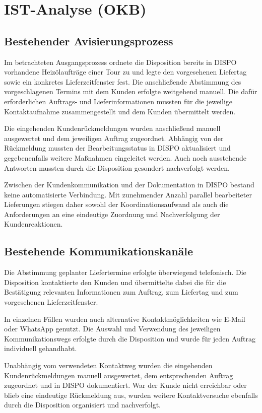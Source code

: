 \section{IST-Analyse (OKB)}

\subsection{Bestehender Avisierungsprozess}

Im betrachteten Ausgangsprozess ordnete die Disposition bereits
in DISPO vorhandene Heizölaufträge einer Tour zu und
legte den vorgesehenen Liefertag sowie ein konkretes
Lieferzeitfenster fest. Die anschließende Abstimmung des
vorgeschlagenen Termins mit dem Kunden erfolgte weitgehend
manuell. Die dafür erforderlichen Auftrags- und
Lieferinformationen mussten für die jeweilige Kontaktaufnahme
zusammengestellt und dem Kunden übermittelt werden.

Die eingehenden Kundenrückmeldungen wurden anschließend manuell
ausgewertet und dem jeweiligen Auftrag zugeordnet. Abhängig von
der Rückmeldung mussten der Bearbeitungsstatus in DISPO
aktualisiert und gegebenenfalls weitere Maßnahmen eingeleitet
werden. Auch noch ausstehende Antworten mussten durch die
Disposition gesondert nachverfolgt werden.

Zwischen der Kundenkommunikation und der Dokumentation in
DISPO bestand keine automatisierte Verbindung. Mit
zunehmender Anzahl parallel bearbeiteter Lieferungen stiegen
daher sowohl der Koordinationsaufwand als auch die Anforderungen
an eine eindeutige Zuordnung und Nachverfolgung der
Kundenreaktionen.

\subsection{Bestehende Kommunikationskanäle}

Die Abstimmung geplanter Liefertermine erfolgte überwiegend
telefonisch. Die Disposition kontaktierte den Kunden und
übermittelte dabei die für die Bestätigung relevanten
Informationen zum Auftrag, zum Liefertag und zum vorgesehenen
Lieferzeitfenster.

In einzelnen Fällen wurden auch alternative Kontaktmöglichkeiten
wie E-Mail oder WhatsApp genutzt. Die Auswahl und Verwendung des
jeweiligen Kommunikationswegs erfolgte durch die Disposition und
wurde für jeden Auftrag individuell gehandhabt.

Unabhängig vom verwendeten Kontaktweg wurden die eingehenden
Kundenrückmeldungen manuell ausgewertet, dem entsprechenden
Auftrag zugeordnet und in DISPO dokumentiert. War der
Kunde nicht erreichbar oder blieb eine eindeutige Rückmeldung
aus, wurden weitere Kontaktversuche ebenfalls durch die
Disposition organisiert und nachverfolgt.

